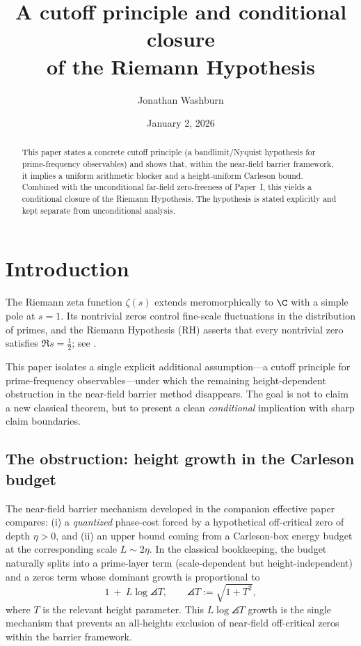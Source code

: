 \documentclass[11pt]{article}
\title{A cutoff principle and conditional closure\\of the Riemann Hypothesis}
\author{Jonathan Washburn}
\date{January 2, 2026}
\begin{document}
\maketitle

\begin{abstract}
This paper states a concrete cutoff principle (a bandlimit/Nyquist hypothesis for prime-frequency observables) and shows that, within the near-field barrier framework, it implies a uniform arithmetic blocker and a height-uniform Carleson bound.
Combined with the unconditional far-field zero-freeness of Paper~I, this yields a conditional closure of the Riemann Hypothesis.
The hypothesis is stated explicitly and kept separate from unconditional analysis.
\end{abstract}

\section{Introduction}\label{sec:intro}

The Riemann zeta function $\zeta(s)$ extends meromorphically to $\C$ with a simple pole at $s=1$.
Its nontrivial zeros control fine-scale fluctuations in the distribution of primes, and the Riemann Hypothesis (RH) asserts that every nontrivial zero satisfies $\Re s=\tfrac12$; see \cite{Titchmarsh,IK}.

This paper isolates a single explicit additional assumption---a cutoff principle for prime-frequency observables---under which the remaining height-dependent obstruction in the near-field barrier method disappears.
The goal is not to claim a new classical theorem, but to present a clean \emph{conditional} implication with sharp claim boundaries.

\subsection*{The obstruction: height growth in the Carleson budget}
The near-field barrier mechanism developed in the companion effective paper compares:
(i) a \emph{quantized} phase-cost forced by a hypothetical off-critical zero of depth $\eta>0$, and
(ii) an upper bound coming from a Carleson-box energy budget at the corresponding scale $L\sim 2\eta$.
In the classical bookkeeping, the budget naturally splits into a prime-layer term (scale-dependent but height-independent) and a zeros term whose dominant growth is proportional to
\[
  1\ +\ L\log\angles{T},
  \qquad \angles{T}:=\sqrt{1+T^2},
\]
where $T$ is the relevant height parameter.
This $L\log\angles{T}$ growth is the single mechanism that prevents an all-heights exclusion of near-field off-critical zeros within the barrier framework.
\end{document}
